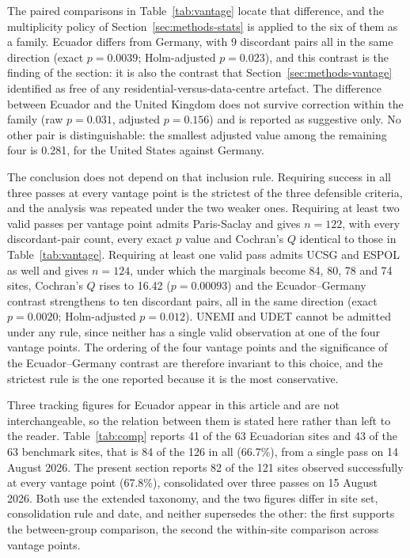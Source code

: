 \documentclass[pdflatex,sn-basic,Numbered,iicol]{sn-jnl}
\theoremstyle{thmstyleone}
\theoremstyle{thmstyletwo}
\theoremstyle{thmstylethree}
\begin{document}
	The paired comparisons in Table~\ref{tab:vantage} locate that difference, and the multiplicity policy of Section~\ref{sec:methods-stats} is applied to the six of them as a family. Ecuador differs from Germany, with 9 discordant pairs all in the same direction (exact $p=0.0039$; Holm-adjusted $p=0.023$), and this contrast is the finding of the section: it is also the contrast that Section~\ref{sec:methods-vantage} identified as free of any residential-versus-data-centre artefact. The difference between Ecuador and the United Kingdom does not survive correction within the family (raw $p=0.031$, adjusted $p=0.156$) and is reported as suggestive only. No other pair is distinguishable: the smallest adjusted value among the remaining four is 0.281, for the United States against Germany.
	
	The conclusion does not depend on that inclusion rule. Requiring success in all three passes at every vantage point is the strictest of the three defensible criteria, and the analysis was repeated under the two weaker ones. Requiring at least two valid passes per vantage point admits Paris-Saclay and gives $n=122$, with every discordant-pair count, every exact $p$ value and Cochran's $Q$ identical to those in Table~\ref{tab:vantage}. Requiring at least one valid pass admits UCSG and ESPOL as well and gives $n=124$, under which the marginals become 84, 80, 78 and 74 sites, Cochran's $Q$ rises to 16.42 ($p=0.00093$) and the Ecuador--Germany contrast strengthens to ten discordant pairs, all in the same direction (exact $p=0.0020$; Holm-adjusted $p=0.012$). UNEMI and UDET cannot be admitted under any rule, since neither has a single valid observation at one of the four vantage points. The ordering of the four vantage points and the significance of the Ecuador--Germany contrast are therefore invariant to this choice, and the strictest rule is the one reported because it is the most conservative.
	
	Three tracking figures for Ecuador appear in this article and are not interchangeable, so the relation between them is stated here rather than left to the reader. Table~\ref{tab:comp} reports 41 of the 63 Ecuadorian sites and 43 of the 63 benchmark sites, that is 84 of the 126 in all (66.7\%), from a single pass on 14 August 2026. The present section reports 82 of the 121 sites observed successfully at every vantage point (67.8\%), consolidated over three passes on 15 August 2026. Both use the extended taxonomy, and the two figures differ in site set, consolidation rule and date, and neither supersedes the other: the first supports the between-group comparison, the second the within-site comparison across vantage points.
	
\end{document}
